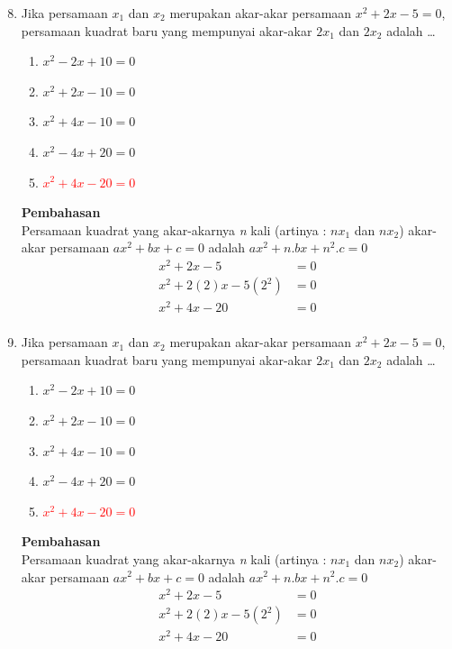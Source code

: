 \documentclass{report}
\newcommand{\options}[5]{
\begin{enumerate}[label=\alph*.]
	\item #1
	\item #2
	\item #3
	\item #4
	\item #5
\end{enumerate}
}
\newcommand{\pemb}{ \textbf{Pembahasan} \\}
\begin{document}
\begin{enumerate}
\setcounter{enumi}{7}
\item Jika persamaan $x_{1}$ dan $x_{2}$ merupakan akar-akar persamaan $x^2+2x-5=0$, persamaan kuadrat baru yang mempunyai akar-akar $2x_{1}$ dan $2x_{2}$ adalah \ldots
\options
{$x^2-2x+10=0$}
{$x^2+2x-10=0$}
{$x^2+4x-10=0$}
{$x^2-4x+20=0$}
{\textcolor{red}{$x^2+4x-20=0$}}
\pemb
Persamaan kuadrat yang akar-akarnya \emph{n} kali (artinya : $nx_{1}$ dan $nx_{2}$) akar-akar persamaan $ax^2+bx+c=0$ adalah $ax^2+n.bx+n^2.c=0$
\begin{align*}
	x^2+2x-5 &= 0 \\
	x^2+2(2)x-5(2^2) &= 0 \\
	x^2+4x-20 &= 0 \\
\end{align*}

\item Jika persamaan $x_{1}$ dan $x_{2}$ merupakan akar-akar persamaan $x^2+2x-5=0$, persamaan kuadrat baru yang mempunyai akar-akar $2x_{1}$ dan $2x_{2}$ adalah \ldots
\options
{$x^2-2x+10=0$}
{$x^2+2x-10=0$}
{$x^2+4x-10=0$}
{$x^2-4x+20=0$}
{\textcolor{red}{$x^2+4x-20=0$}}
\pemb
Persamaan kuadrat yang akar-akarnya \emph{n} kali (artinya : $nx_{1}$ dan $nx_{2}$) akar-akar persamaan $ax^2+bx+c=0$ adalah $ax^2+n.bx+n^2.c=0$
\begin{align*}
	x^2+2x-5 &= 0 \\
	x^2+2(2)x-5(2^2) &= 0 \\
	x^2+4x-20 &= 0 \\
\end{align*}


\end{enumerate}
\end{document}
